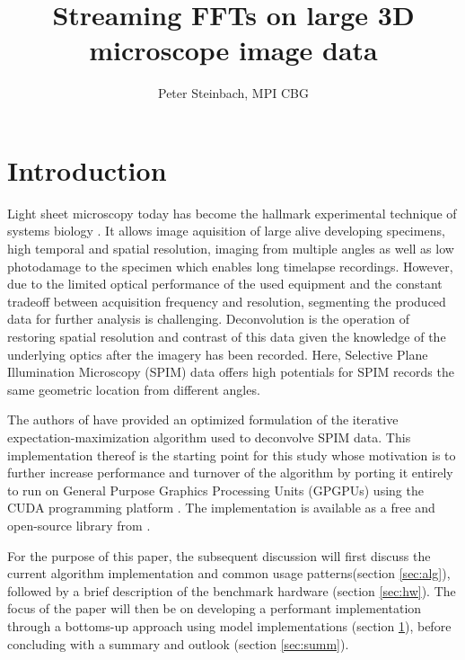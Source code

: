 \documentclass [12pt]{article}
\title{Streaming FFTs on large 3D microscope image data}
\author{Peter Steinbach, MPI CBG}
\begin{document}
\maketitle
\begin{abstract}

\end{abstract}

\section{Introduction}

Light sheet microscopy today has become the hallmark experimental technique of systems biology \cite{Huisken13082004, Keller14112008}. It allows image aquisition of large alive developing specimens, high temporal and spatial resolution, imaging from multiple angles as well as low photodamage to the specimen which enables long timelapse recordings. However, due to the limited optical performance of the used equipment and the constant tradeoff between acquisition frequency and resolution, segmenting the produced data for further analysis is challenging. Deconvolution is the operation of restoring spatial resolution and contrast of this data given the knowledge of the underlying optics after the imagery has been recorded. Here, Selective Plane Illumination Microscopy (SPIM) data offers high potentials for SPIM records the same geometric location from different angles.\newline

The authors of \cite{2013arXiv1308.0730P} have provided an optimized formulation of the iterative expectation-maximization algorithm used to deconvolve SPIM data. This implementation thereof \cite{gh_spim_registration} is the starting point for this study whose motivation is to further increase performance and turnover of the algorithm by porting it entirely to run on General Purpose Graphics Processing Units (GPGPUs) using the CUDA programming platform \cite{Nickolls:2008:CUDA}. The implementation is available as a free and open-source library from \cite{lmvn_repo}.\newline

For the purpose of this paper, the subsequent discussion will first discuss the current algorithm implementation and common usage patterns(section \ref{sec:alg}), followed by a brief description of the benchmark hardware (section \ref{sec:hw}). The focus of the paper will then be on developing a performant implementation through a bottoms-up approach using model implementations (section \ref{}), before concluding with a summary and outlook (section \ref{sec:summ}).\newline
\end{document}
